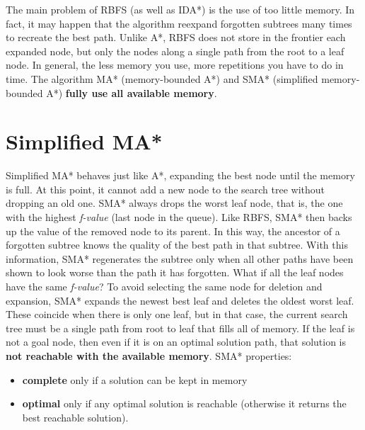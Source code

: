 The main problem of RBFS (as well as IDA*) is the use of too little memory. In fact, it may happen that the algorithm reexpand forgotten subtrees many times to recreate the best path. Unlike A*, RBFS does not store in the frontier each expanded node, but only the nodes along a single path from the root to a leaf node. 
\newline\newline
In general, the less memory you use, more repetitions you have to do in time. The algorithm MA* (memory-bounded A*) and SMA* (simplified memory-bounded A*) \textbf{fully use all available memory}.

\section{Simplified MA*}
Simplified MA* behaves just like A*, expanding the best node until the memory is full. At this point, it cannot add a new node to the search tree without dropping an old one. SMA* always drops the worst leaf node, that is, the one with the highest \textit{f-value} (last node in the queue). Like RBFS, SMA* then backs up the value of the removed node to its parent. In this way, the ancestor of a forgotten subtree knows the quality of the best path in that subtree. With this information, SMA* regenerates the subtree only when all other paths have been shown to look worse than the path it has forgotten.\newline\newline
What if all the leaf nodes have the same \textit{f-value}? To avoid selecting the same node for deletion and expansion, SMA* expands the newest best leaf and deletes the oldest worst leaf. These coincide when there is only one leaf, but in that case, the current search tree must be a single path from root to leaf that fills all of memory. If the leaf is not a goal node, then even if it is on
an optimal solution path, that solution is \textbf{not reachable with the available memory}.\newline\newline
SMA* properties:
\begin{itemize}
    \item \textbf{complete} only if a solution can be kept in memory
    \item \textbf{optimal} only if any optimal solution is reachable (otherwise it returns the best reachable solution).
\end{itemize}

